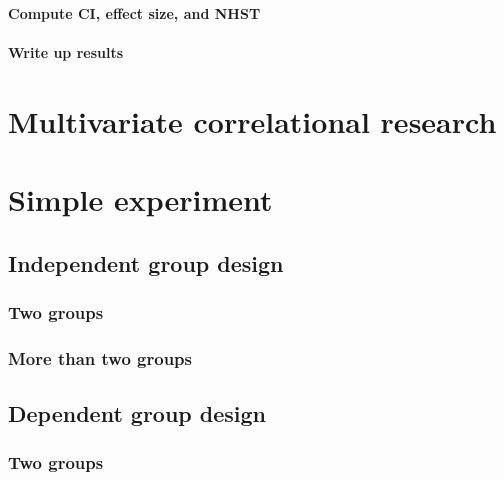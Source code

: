 \documentclass[
]{book}
\begin{document}
\hypertarget{compute-ci-effect-size-and-nhst}{%
\subsubsection{Compute CI, effect size, and NHST}\label{compute-ci-effect-size-and-nhst}}

\hypertarget{write-up-results}{%
\subsubsection{Write up results}\label{write-up-results}}

\hypertarget{multivariate-correlational-research}{%
\chapter{Multivariate correlational research}\label{multivariate-correlational-research}}

\hypertarget{simple-experiment}{%
\chapter{Simple experiment}\label{simple-experiment}}

\hypertarget{independent-group-design}{%
\section{Independent group design}\label{independent-group-design}}

\hypertarget{two-groups}{%
\subsection{Two groups}\label{two-groups}}

\hypertarget{more-than-two-groups}{%
\subsection{More than two groups}\label{more-than-two-groups}}

\hypertarget{dependent-group-design}{%
\section{Dependent group design}\label{dependent-group-design}}

\hypertarget{two-groups-1}{%
\subsection{Two groups}\label{two-groups-1}}
\end{document}
